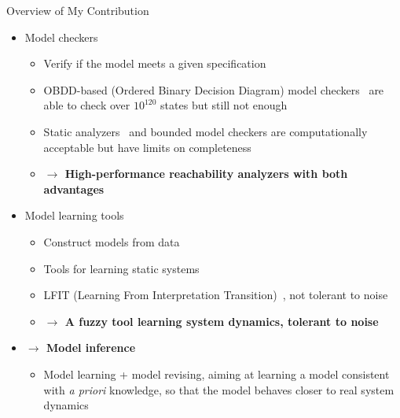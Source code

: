 \documentclass[8pt]{beamer}
\newcommand{\highlight}[1]{\textcolor{blue!50}{\textbf{#1}}}
\begin{document}
\begin{frame}{Overview of My Contribution}
\begin{itemize}[<+->]
    \item Model checkers
    \begin{itemize}
        \item Verify if the model meets a given specification
        \item OBDD-based (Ordered Binary Decision Diagram) model checkers~\cite{brayton1996vis,cimatti2000nusmv} are able to check over $10^{120}$ states but still not enough
        \item Static analyzers~\cite{pauleve2012} and bounded model checkers are computationally acceptable but have limits on completeness
        \item \highlight{$\to$ High-performance reachability analyzers with both advantages}
    \end{itemize}
    \item Model learning tools
    \begin{itemize}
    	\item Construct models from data
        \item Tools for learning static systems~\cite{mochida2018statistical}
        \item LFIT (Learning From Interpretation Transition)~\cite{ribeiro2018learning}, not tolerant to noise
        \item \highlight{$\to$ A fuzzy tool learning system dynamics, tolerant to noise}  
    \end{itemize}
    \item \highlight{$\to$ Model inference}
    \begin{itemize}
        \item Model learning + model revising, aiming at learning a model consistent with \textit{a priori} knowledge, so that the model behaves closer to real system dynamics
    \end{itemize}
\end{itemize}

\vspace{0.5cm}
\Large
{}
\end{frame}
\end{document}
